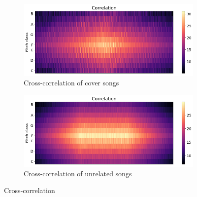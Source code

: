 \begin{figure}[htbp]
{{			\begin{subfigure}{.495\textwidth}
				\centering    
				\includegraphics[scale=0.3]{Images/Chroma/cross_hurricane.png}
				\caption{Cross-correlation of cover songs}
				\label{cc1}
			\end{subfigure}		
			\begin{subfigure}{.495\textwidth}
				\centering     
				\includegraphics[scale=0.3]{Images/Chroma/cross_hurricane_sia.png}
				\caption{Cross-correlation of unrelated songs}
				\label{cc2}
			\end{subfigure}%
	}}
	\caption{Cross-correlation}
	\label{fig:crosscorr}
\end{figure}
\FloatBarrier

